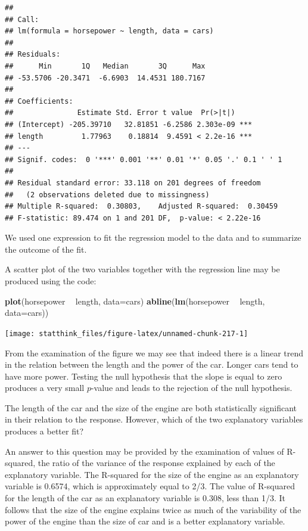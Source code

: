 \documentclass[]{krantz}
\makeatletter
\newenvironment{Shaded}{\begin{snugshade}}{\end{snugshade}}
\newcommand{\KeywordTok}[1]{\textcolor[rgb]{0.13,0.29,0.53}{\textbf{#1}}}
\newcommand{\DataTypeTok}[1]{\textcolor[rgb]{0.13,0.29,0.53}{#1}}
\newcommand{\StringTok}[1]{\textcolor[rgb]{0.31,0.60,0.02}{#1}}
\newcommand{\OperatorTok}[1]{\textcolor[rgb]{0.81,0.36,0.00}{\textbf{#1}}}
\newcommand{\NormalTok}[1]{#1}
\newenvironment{kframe}{%
\medskip{}
\setlength{\fboxsep}{.8em}
 \def\at@end@of@kframe{}%
 \ifinner\ifhmode%
  \def\at@end@of@kframe{\end{minipage}}%
  \begin{minipage}{\columnwidth}%
 \fi\fi%
 \def\FrameCommand##1{\hskip\@totalleftmargin \hskip-\fboxsep
 \colorbox{shadecolor}{##1}\hskip-\fboxsep
     \hskip-\linewidth \hskip-\@totalleftmargin \hskip\columnwidth}%
 \MakeFramed {\advance\hsize-\width
   \@totalleftmargin\z@ \linewidth\hsize
   \@setminipage}}%
 {\par\unskip\endMakeFramed%
 \at@end@of@kframe}
\renewenvironment{Shaded}{\begin{kframe}}{\end{kframe}}
\theoremstyle{definition}
\theoremstyle{definition}
\theoremstyle{definition}
\theoremstyle{remark}
\makeatother
\begin{document}
\begin{verbatim}
## 
## Call:
## lm(formula = horsepower ~ length, data = cars)
## 
## Residuals:
##      Min       1Q   Median       3Q      Max 
## -53.5706 -20.3471  -6.6903  14.4531 180.7167 
## 
## Coefficients:
##               Estimate Std. Error t value  Pr(>|t|)    
## (Intercept) -205.39710   32.81851 -6.2586 2.303e-09 ***
## length         1.77963    0.18814  9.4591 < 2.2e-16 ***
## ---
## Signif. codes:  0 '***' 0.001 '**' 0.01 '*' 0.05 '.' 0.1 ' ' 1
## 
## Residual standard error: 33.118 on 201 degrees of freedom
##   (2 observations deleted due to missingness)
## Multiple R-squared:  0.30803,    Adjusted R-squared:  0.30459 
## F-statistic: 89.474 on 1 and 201 DF,  p-value: < 2.22e-16
\end{verbatim}

We used one expression to fit the regression model to the data and to
summarize the outcome of the fit.

A scatter plot of the two variables together with the regression line
may be produced using the code:

\begin{Shaded}
\begin{Highlighting}[]
\KeywordTok{plot}\NormalTok{(horsepower }\OperatorTok{~}\StringTok{ }\NormalTok{length, }\DataTypeTok{data=}\NormalTok{cars)}
\KeywordTok{abline}\NormalTok{(}\KeywordTok{lm}\NormalTok{(horsepower }\OperatorTok{~}\StringTok{ }\NormalTok{length, }\DataTypeTok{data=}\NormalTok{cars))}
\end{Highlighting}
\end{Shaded}

\begin{center}\texttt{[image: statthink\_files/figure-latex/unnamed-chunk-217-1]} \end{center}

From the examination of the figure we may see that indeed there is a
linear trend in the relation between the length and the power of the
car. Longer cars tend to have more power. Testing the null hypothesis
that the slope is equal to zero produces a very small \(p\)-value and
leads to the rejection of the null hypothesis.

The length of the car and the size of the engine are both statistically
significant in their relation to the response. However, which of the two
explanatory variables produces a better fit?

An answer to this question may be provided by the examination of values
of R-squared, the ratio of the variance of the response explained by
each of the explanatory variable. The R-squared for the size of the
engine as an explanatory variable is 0.6574, which is approximately
equal to 2/3. The value of R-squared for the length of the car as an
explanatory variable is 0.308, less than 1/3. It follows that the size
of the engine explains twice as much of the variability of the power of
the engine than the size of car and is a better explanatory variable.
\end{document}
